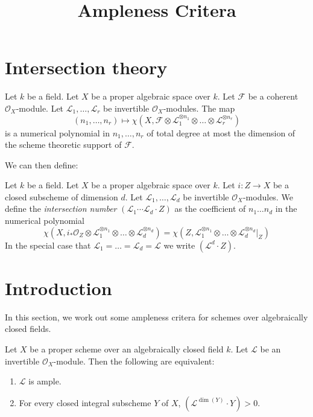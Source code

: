 


\newcommand{\todo}[1]{\footnote{\textbf{TODO.} #1}}

\title{Ampleness Critera}
\maketitle

\section{Intersection theory}
\begin{lemma}\label{tag:0DN4}
Let $k$ be a field. Let $X$ be a proper algebraic space over $k$.
Let $\mathcal{F}$ be a coherent $\mathcal{O}_X$-module. Let
$\mathcal{L}_1, \ldots, \mathcal{L}_r$ be invertible $\mathcal{O}_X$-modules.
The map
$$
(n_1, \ldots, n_r) \longmapsto
\chi(X, \mathcal{F} \otimes
\mathcal{L}_1^{\otimes n_1} \otimes \ldots \otimes
\mathcal{L}_r^{\otimes n_r})
$$
is a numerical polynomial in $n_1, \ldots, n_r$ of total degree at
most the dimension of the scheme theoretic support of $\mathcal{F}$.
\end{lemma}
We can then define:
\begin{definition}\label{tag:0BEP}
Let $k$ be a field. Let $X$ be a proper algebraic space over $k$. Let
$i : Z \to X$ be a closed subscheme of dimension $d$. Let
$\mathcal{L}_1, \ldots, \mathcal{L}_d$ be invertible
$\mathcal{O}_X$-modules. We define the {\it intersection number}
$(\mathcal{L}_1 \cdots \mathcal{L}_d \cdot Z)$
as the coefficient of $n_1 \ldots n_d$ in the numerical polynomial
$$
\chi(X, i_*\mathcal{O}_Z \otimes \mathcal{L}_1^{\otimes n_1} \otimes
\ldots \otimes \mathcal{L}_d^{\otimes n_d}) =
\chi(Z, \mathcal{L}_1^{\otimes n_1} \otimes
\ldots \otimes \mathcal{L}_d^{\otimes n_d}|_Z)
$$
In the special
case that $\mathcal{L}_1 = \ldots = \mathcal{L}_d = \mathcal{L}$
we write $(\mathcal{L}^d \cdot Z)$.
\end{definition}

\section{Introduction}
In this section, we work out some ampleness critera for schemes over
algebraically closed fields.

\begin{theorem}
\label{theorem-nakai-moishezon}
Let $X$ be a proper scheme over an algebraically closed field $k$.
Let $\mathcal{L}$ be an invertible $\mathcal{O}_X$-module.
Then the following are equivalent:
\begin{enumerate}
  \item $\mathcal{L}$ is ample.
  \item For every closed integral subscheme $Y$ of $X$,
    $(\mathcal{L}^{\dim(Y)} \cdot Y) > 0$.
\end{enumerate}
\end{theorem}

